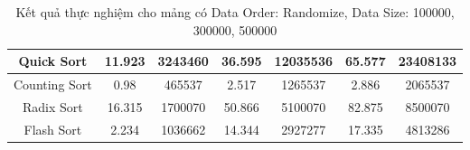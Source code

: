 \begin{table}[H]
{\begin{tabular}{|ccccccc|}
\multicolumn{1}{|c|}{Quick Sort} & \multicolumn{1}{c|}{11.923} & \multicolumn{1}{c|}{3243460} & \multicolumn{1}{c|}{36.595} & \multicolumn{1}{c|}{12035536} & \multicolumn{1}{c|}{65.577} & \multicolumn{1}{c|}{23408133} \\ \hline
\multicolumn{1}{|c|}{Counting Sort} & \multicolumn{1}{c|}{0.98} & \multicolumn{1}{c|}{465537} & \multicolumn{1}{c|}{2.517} & \multicolumn{1}{c|}{1265537} & \multicolumn{1}{c|}{2.886} & \multicolumn{1}{c|}{2065537} \\ \hline
\multicolumn{1}{|c|}{Radix Sort} & \multicolumn{1}{c|}{16.315} & \multicolumn{1}{c|}{1700070} & \multicolumn{1}{c|}{50.866} & \multicolumn{1}{c|}{5100070} & \multicolumn{1}{c|}{82.875} & \multicolumn{1}{c|}{8500070} \\ \hline
\multicolumn{1}{|c|}{Flash Sort} & \multicolumn{1}{c|}{2.234} & \multicolumn{1}{c|}{1036662} & \multicolumn{1}{c|}{14.344} & \multicolumn{1}{c|}{2927277} & \multicolumn{1}{c|}{17.335} & \multicolumn{1}{c|}{4813286} \\ \hline
\end{tabular}%
}
\caption{Kết quả thực nghiệm cho mảng có Data Order: Randomize, Data Size: 100000, 300000, 500000}
\label{tab:randomize_100000_300000_500000}
\end{table}

